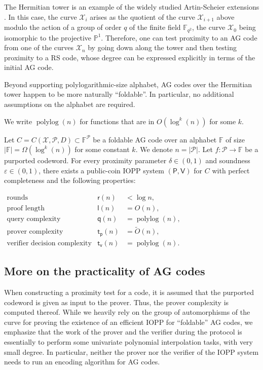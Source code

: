 \documentclass[a4paper,USenglish,autoref]{lipics-v2021}
\renewcommand\epsilon{\varepsilon}
\newcommand\F{\mathbb{F}}
\newcommand\PP{\mathbb{P}}
\DeclareMathOperator{\polylog}{polylog}
\newcommand\prover{\mathsf{P}}
\newcommand\verifier{\mathsf{V}}
\newcommand{\size}[1]{\left|#1\right|}
\newcommand\calX{\mathcal{X}}
\newcommand\calP{\mathcal{P}}
\begin{document}
The Hermitian tower is an example of the widely studied Artin-Scheier extensions \cite{L92,S08}. In this case, the curve $\calX_i$ arises as the quotient of the curve $\calX_{i+1}$ above modulo the action of a group of order $q$ of the finite field $\F_{q^2}$, the curve $\calX_0$ being isomorphic to the projective $\PP^1$. Therefore, one can test proximity to an AG code from one of the curves $\calX_n$ by going down along the tower and then testing proximity to a RS code, whose degree can be expressed explicitly in terms of the initial AG code. 

Beyond supporting polylogarithmic-size alphabet, AG codes over the Hermitian tower happen to be more naturally ``foldable''. In particular, no additional assumptions on the alphabet are required.

We write $\polylog(n)$ for functions that are in $O\left(\log^k(n)\right)$ for some $k$.

\begin{theorem}\label{thm:intro-tower} 
	Let ${C = C(\calX, \calP, D)} \subset \F^{\calP}$ be a foldable AG code over an alphabet $\F$ of size $\size \F = \Omega(\log^k(n))$ for some constant $k$.
	We denote $n = \size{\calP}$. Let $f : \calP \rightarrow \F$ be a purported codeword. For every proximity parameter $\delta \in (0, 1)$ and soundness $\epsilon \in (0,1)$, there exists a public-coin IOPP system $(\prover, \verifier)$ for $C$ with perfect completeness and the following properties:
	
	$
	\begin{array}{lll}
		\text{rounds} &\mathsf{r}(n) &< \log n,\\
		\text{proof length} &\mathsf{l}(n) &= O(n),\\
		\text{query complexity} &\mathsf{q}(n) &= \polylog(n),\\
		\text{prover complexity} &\mathsf{t_p}(n) &= \widetilde{O}(n),\\
		\text{verifier decision complexity} & \mathsf{t_v}(n) &= \polylog(n).
	\end{array}
	$
\end{theorem}

\subsection{More on the practicality of AG codes}\label{subsec:ag-encoding}
When constructing a proximity test for a code, it is assumed that the purported codeword is given as input to the prover. Thus, the prover complexity is computed thereof. While we heavily rely on the group of automorphisms of the curve for proving the existence of an efficient IOPP for ``foldable'' AG codes, we emphasize that the work of the prover and the verifier during the protocol is essentially to perform some univariate polynomial interpolation tasks, with very small degree. In particular, neither the prover nor the verifier of the IOPP system needs to run an encoding algorithm for AG codes.
\end{document}
